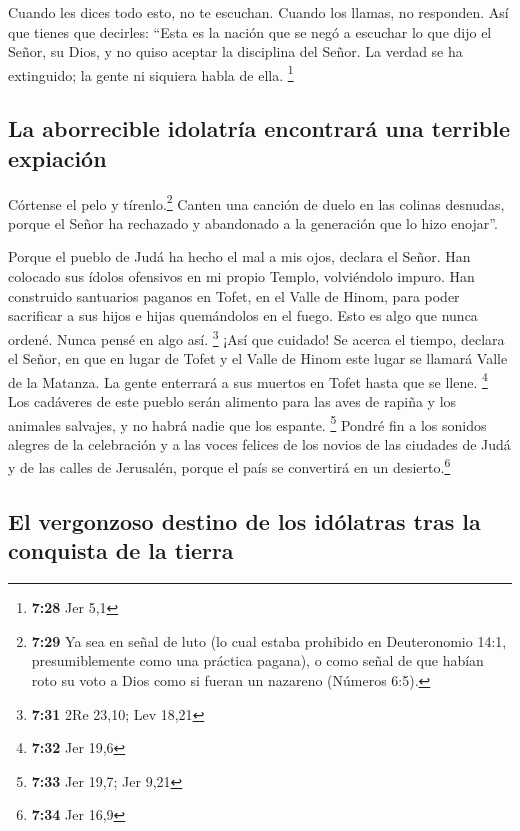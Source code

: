  Cuando les dices todo esto, no te escuchan. Cuando los
llamas, no responden.  Así que tienes que decirles:
``Esta es la nación que se negó a escuchar lo que dijo el Señor, su
Dios, y no quiso aceptar la disciplina del Señor. La verdad se ha
extinguido; la gente ni siquiera habla de ella. \footnote{\textbf{7:28}
  Jer 5,1}

\hypertarget{la-aborrecible-idolatruxeda-encontraruxe1-una-terrible-expiaciuxf3n}{%
\subsection{La aborrecible idolatría encontrará una terrible
expiación}\label{la-aborrecible-idolatruxeda-encontraruxe1-una-terrible-expiaciuxf3n}}

 Córtense el pelo y tírenlo.\footnote{\textbf{7:29} Ya
  sea en señal de luto (lo cual estaba prohibido en Deuteronomio 14:1,
  presumiblemente como una práctica pagana), o como señal de que habían
  roto su voto a Dios como si fueran un nazareno (Números 6:5).} Canten
una canción de duelo en las colinas desnudas, porque el Señor ha
rechazado y abandonado a la generación que lo hizo enojar''.

 Porque el pueblo de Judá ha hecho el mal a mis ojos,
declara el Señor. Han colocado sus ídolos ofensivos en mi propio Templo,
volviéndolo impuro.  Han construido santuarios paganos en
Tofet, en el Valle de Hinom, para poder sacrificar a sus hijos e hijas
quemándolos en el fuego. Esto es algo que nunca ordené. Nunca pensé en
algo así. \footnote{\textbf{7:31} 2Re 23,10; Lev 18,21} 
¡Así que cuidado! Se acerca el tiempo, declara el Señor, en que en lugar
de Tofet y el Valle de Hinom este lugar se llamará Valle de la Matanza.
La gente enterrará a sus muertos en Tofet hasta que se llene.
\footnote{\textbf{7:32} Jer 19,6}  Los cadáveres de este
pueblo serán alimento para las aves de rapiña y los animales salvajes, y
no habrá nadie que los espante. \footnote{\textbf{7:33} Jer 19,7; Jer
  9,21}  Pondré fin a los sonidos alegres de la
celebración y a las voces felices de los novios de las ciudades de Judá
y de las calles de Jerusalén, porque el país se convertirá en un
desierto.\footnote{\textbf{7:34} Jer 16,9}

\hypertarget{el-vergonzoso-destino-de-los-iduxf3latras-tras-la-conquista-de-la-tierra}{%
\subsection{El vergonzoso destino de los idólatras tras la conquista de
la
tierra}\label{el-vergonzoso-destino-de-los-iduxf3latras-tras-la-conquista-de-la-tierra}}

